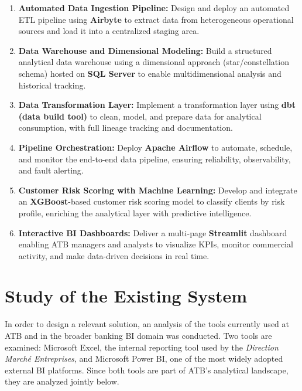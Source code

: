 \begin{enumerate}
    \item \textbf{Automated Data Ingestion Pipeline:} Design and deploy an automated ETL
    pipeline using \textbf{Airbyte} to extract data from heterogeneous operational sources
    and load it into a centralized staging area.

    \item \textbf{Data Warehouse and Dimensional Modeling:} Build a structured analytical
    data warehouse using a dimensional approach (star/constellation schema) hosted on
    \textbf{SQL Server} to enable multidimensional analysis and historical tracking.

    \item \textbf{Data Transformation Layer:} Implement a transformation layer using
    \textbf{dbt (data build tool)} to clean, model, and prepare data for analytical
    consumption, with full lineage tracking and documentation.

    \item \textbf{Pipeline Orchestration:} Deploy \textbf{Apache Airflow} to automate,
    schedule, and monitor the end-to-end data pipeline, ensuring reliability,
    observability, and fault alerting.

    \item \textbf{Customer Risk Scoring with Machine Learning:} Develop and integrate an
    \textbf{XGBoost}-based customer risk scoring model to classify clients by risk profile,
    enriching the analytical layer with predictive intelligence.

    \item \textbf{Interactive BI Dashboards:} Deliver a multi-page \textbf{Streamlit}
    dashboard enabling ATB managers and analysts to visualize KPIs, monitor commercial
    activity, and make data-driven decisions in real time.
\end{enumerate}

\section{Study of the Existing System}

In order to design a relevant solution, an analysis of the tools currently used at ATB and
in the broader banking BI domain was conducted. Two tools are examined: Microsoft Excel,
the internal reporting tool used by the \textit{Direction March\'{e} Entreprises}, and
Microsoft Power BI, one of the most widely adopted external BI platforms. Since both tools
are part of ATB's analytical landscape, they are analyzed jointly below.

